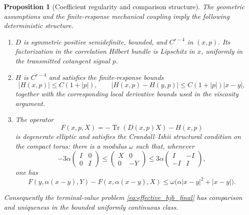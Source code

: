 \documentclass[12pt, letterpaper]{amsart}
\providecommand{\Tr}{\operatorname{Tr}}
\theoremstyle{plain}
\newtheorem{proposition}[theorem]{Proposition}
\theoremstyle{definition}
\theoremstyle{remark}
\begin{document}
\begin{proposition}[Coefficient regularity and comparison structure]
\label{prop:coefficient_structure}
The geometric assumptions and the finite-response mechanical coupling imply the
following deterministic structure.
\begin{enumerate}[label=(\roman*), wide, labelindent=0pt]
    \item $D$ is symmetric positive semidefinite, bounded, and $C^{r-4}$ in
    $(x,p)$.  Its factorization in the correlation Hilbert bundle is Lipschitz
    in $x$, uniformly in the transmitted cotangent signal $p$.
    \item $H$ is $C^{r-4}$ and satisfies the finite-response bounds
    \begin{equation}
    \label{eq:H_growth_structure}
        |H(x,p)|\le C(1+|p|),\qquad
        |H(x,p)-H(y,p)|\le C(1+|p|)|x-y|,
    \end{equation}
    together with the corresponding local derivative bounds used in the
    viscosity argument.
    \item The operator
    \begin{equation}
        F(x,p,X)=-\Tr(D(x,p)X)-H(x,p)
    \end{equation}
    is degenerate elliptic and satisfies the Crandall--Ishii structural
    condition on the compact torus: there is a modulus $\omega$ such that,
    whenever
    \begin{equation}
        -3\alpha\begin{pmatrix}I&0\\0&I\end{pmatrix}
        \le
        \begin{pmatrix}X&0\\0&-Y\end{pmatrix}
        \le
        3\alpha\begin{pmatrix}I&-I\\-I&I\end{pmatrix},
    \end{equation}
    one has
    \begin{equation}
    \label{eq:global_CIL_condition}
        F(y,\alpha(x-y),Y)-F(x,\alpha(x-y),X)
        \le \omega\bigl(\alpha|x-y|^2+|x-y|\bigr).
    \end{equation}
\end{enumerate}
Consequently the terminal-value problem \eqref{eq:effective_hjb_final} has
comparison and uniqueness in the bounded uniformly continuous class.
\end{proposition}
\end{document}

